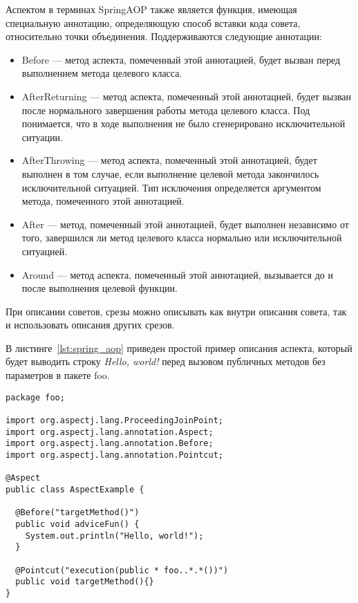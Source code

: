   Аспектом в терминах SpringAOP также является функция, имеющая специальную
  аннотацию, определяющую способ вставки кода совета, относительно точки
  объединения.
  Поддерживаются следующие аннотации:
  \begin{itemize}
    \item Before --- метод аспекта, помеченный этой аннотацией, будет вызван
      перед выполнением метода целевого класса.
    \item AfterReturning --- метод аспекта, помеченный этой аннотацией, 
      будет вызван после нормального завершения работы метода целевого класса.
      Под  понимается, что в ходе выполнения не
      было сгенерировано исключительной ситуации.
    \item AfterThrowing --- метод аспекта, помеченный этой аннотацией, будет 
      выполнен в том случае, если выполнение целевой метода закончилось 
      исключительной ситуацией.
      Тип исключения определяется аргументом метода, помеченного этой 
      аннотацией.
    \item After --- метод, помеченный этой аннотацией, будет выполнен 
    независимо от того, завершился ли метод целевого класса нормально или 
    исключительной ситуацией.
    \item Around --- метод аспекта, помеченный этой аннотацией, вызывается 
    до и после выполнения целевой функции.
  \end{itemize}
  При описании советов, срезы можно описывать как внутри описания совета, так и
  использовать описания других срезов.
  
  В листинге~\ref{lst:spring_aop} приведен простой пример описания аспекта, 
  который будет выводить строку \textit{Hello, world!} перед вызовом 
  публичных методов без параметров в пакете foo.
  \begin{lstlisting}[style={java}, label={lst:spring_aop}, caption={Пример 
  описания аспекта при помощи Spting AOP.}]
package foo;
  
import org.aspectj.lang.ProceedingJoinPoint;
import org.aspectj.lang.annotation.Aspect;
import org.aspectj.lang.annotation.Before;
import org.aspectj.lang.annotation.Pointcut;

@Aspect
public class AspectExample {
  
  @Before("targetMethod()")
  public void adviceFun() {
    System.out.println("Hello, world!");
  }

  @Pointcut("execution(public * foo..*.*())")
  public void targetMethod(){}
}
  \end{lstlisting}
